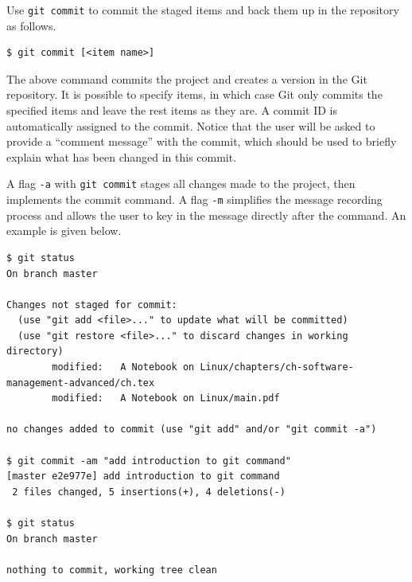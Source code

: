 Use \verb|git commit| to commit the staged items and back them up in the repository as follows.
\begin{lstlisting}
$ git commit [<item name>]
\end{lstlisting}
The above command commits the project and creates a version in the Git repository. It is possible to specify items, in which case Git only commits the specified items and leave the rest items as they are. A commit ID is automatically assigned to the commit. Notice that the user will be asked to provide a ``comment message'' with the commit, which should be used to briefly explain what has been changed in this commit.

A flag \verb|-a| with \verb|git commit| stages all changes made to the project, then implements the commit command. A flag \verb|-m| simplifies the message recording process and allows the user to key in the message directly after the command. An example is given below.
\begin{lstlisting}
$ git status
On branch master

Changes not staged for commit:
  (use "git add <file>..." to update what will be committed)
  (use "git restore <file>..." to discard changes in working directory)
        modified:   A Notebook on Linux/chapters/ch-software-management-advanced/ch.tex
        modified:   A Notebook on Linux/main.pdf

no changes added to commit (use "git add" and/or "git commit -a")

$ git commit -am "add introduction to git command"
[master e2e977e] add introduction to git command
 2 files changed, 5 insertions(+), 4 deletions(-)

$ git status
On branch master

nothing to commit, working tree clean
\end{lstlisting}

